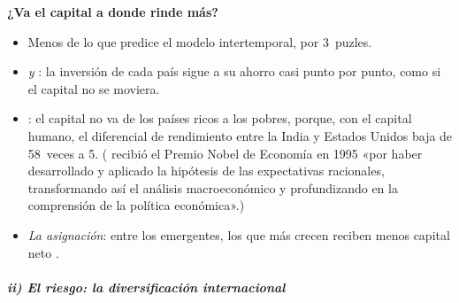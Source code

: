 \documentclass[11pt]{article}
\begin{document}
\begin{anotaciones}
\textbf{¿Va el capital a donde rinde más?} 
\begin{itemize}
\item Menos de lo que predice el modelo intertemporal, por 3~puzles.
\item \emph{ y }: la inversión de cada país sigue a su ahorro casi punto por punto, como si el capital no se moviera\nocite{FeldsteinHorioka1980}.
\item \emph{}: el capital no va de los países ricos a los pobres, porque, con el capital humano, el diferencial de rendimiento entre la India y Estados Unidos baja de 58~veces a 5\nocite{Lucas1990Why}. ( recibió el Premio Nobel de Economía en 1995 «por haber desarrollado y aplicado la hipótesis de las expectativas racionales, transformando así el análisis macroeconómico y profundizando en la comprensión de la política económica»\nocite{Nobel1995Lucas}.)
\item \emph{La asignación}: entre los emergentes, los que más crecen reciben menos capital neto\nocite{GourinchasJeanne2013Capital} .
\end{itemize}
\end{anotaciones}

\subparagraph{ii) El riesgo: la diversificación internacional}
\end{document}
